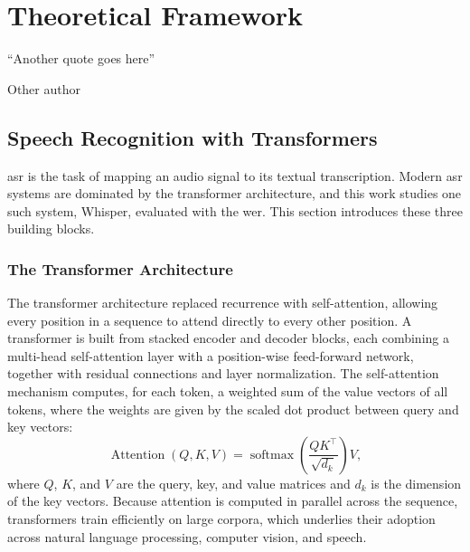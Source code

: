\chapter{Theoretical Framework}
\label{chapter:theoretical-framework}

\epigraph{``Another quote goes here''}{\vspace{10pt}Other author}

\newpage

\section{Speech Recognition with Transformers}\label{sec:asr_transformers}

\acrfull{asr} is the task of mapping an audio signal to its textual transcription. Modern \acrshort{asr} systems are dominated by the transformer architecture, and this work studies one such system, Whisper\cite{radford2023robust}, evaluated with the \acrfull{wer}. This section introduces these three building blocks.

\subsection{The Transformer Architecture}
The transformer architecture \cite{vaswani2017attention} replaced recurrence with self-attention, allowing every position in a sequence to attend directly to every other position. A transformer is built from stacked encoder and decoder blocks, each combining a multi-head self-attention layer with a position-wise feed-forward network, together with residual connections and layer normalization. The self-attention mechanism computes, for each token, a weighted sum of the value vectors of all tokens, where the weights are given by the scaled dot product between query and key vectors:
\begin{equation}
   \operatorname{Attention}(Q, K, V) = \operatorname{softmax}\left(\frac{Q K^\top}{\sqrt{d_k}}\right) V,
\end{equation}
where $Q$, $K$, and $V$ are the query, key, and value matrices and $d_k$ is the dimension of the key vectors. Because attention is computed in parallel across the sequence, transformers train efficiently on large corpora, which underlies their adoption across natural language processing, computer vision, and speech.

